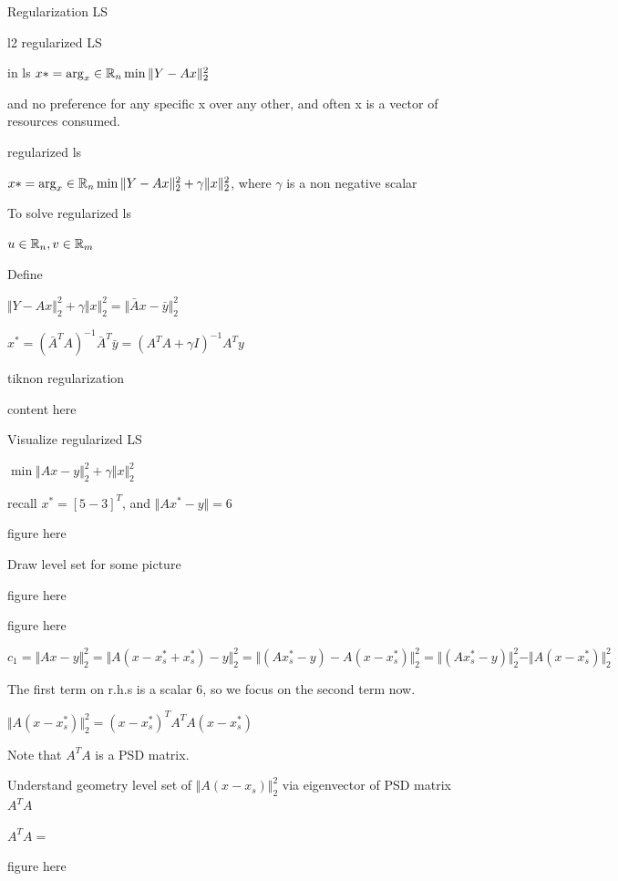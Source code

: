 Regularization LS

l2 regularized LS

in ls $x*=\arg_x\in\mathbb{R}_{n} \min \Vert Y-Ax\Vert ^2_2$

and no preference for any specific x over any other, and often x is a vector of resources consumed.

regularized ls

$x*=\arg_x\in\mathbb{R}_{n} \min \Vert Y-Ax\Vert ^2_2 + \gamma \Vert x\Vert ^2_2$, where $\gamma$ is a non negative scalar


To solve regularized ls

$u\in\mathbb{R}_{n}, v\in\mathbb{R}_{m}$


Define


$\Vert Y-Ax\Vert ^2_2 + \gamma \Vert x\Vert ^2_2=\Vert \bar{A}x-\bar{y}\Vert^2_2$

$x^*=(\bar{A}^TA)^{-1}\bar{A}^T\bar{y}=(A^TA+\gamma I)^{-1}A^Ty$


tiknon regularization

content here


Visualize regularized LS

$\min \Vert Ax-y\Vert_2^2 +\gamma\Vert x\Vert^2_2$

recall $x^*=[5 -3]^T$, and $\Vert Ax^*-y\Vert = 6$

figure here


Draw level set for some picture

figure here

figure here



$c_1=\Vert Ax-y\Vert^2_2=\Vert A(x-x_s^*+x_s^*)-y\Vert^2_2=\Vert (Ax_s^*-y)-A(x-x_s^*)\Vert^2_2=\Vert (Ax_s^*-y)\Vert^2_2 - \Vert A(x-x_s^*)\Vert^2_2$

The first term on r.h.s is a scalar 6, so we focus on the second term now.

$\Vert A(x-x_s^*)\Vert^2_2= (x-x_s^*)^T A^TA (x-x_s^*)$ 

Note that $A^TA$ is a PSD matrix.


Understand geometry level set of $\Vert A(x-x_s)\Vert^2_2$ via eigenvector of PSD matrix $A^TA$


$A^TA=$

figure here

















